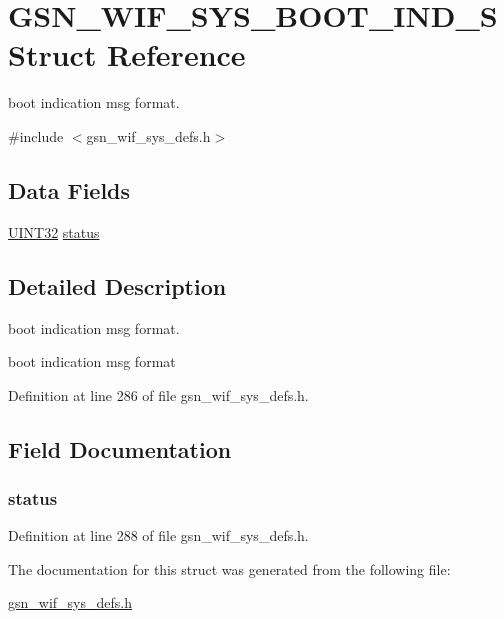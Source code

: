 \hypertarget{a00347}{
\section{GSN\_\-WIF\_\-SYS\_\-BOOT\_\-IND\_\-S Struct Reference}
\label{a00347}
}


boot indication msg format.  




{\ttfamily \#include $<$gsn\_\-wif\_\-sys\_\-defs.h$>$}

\subsection*{Data Fields}
\begin{DoxyCompactItemize}
\item 
\hyperlink{a00660_gae1e6edbbc26d6fbc71a90190d0266018}{UINT32} \hyperlink{a00347_ac6b7193d1fe7063cf448ef96398230d8}{status}
\end{DoxyCompactItemize}


\subsection{Detailed Description}
boot indication msg format. 

boot indication msg format 

Definition at line 286 of file gsn\_\-wif\_\-sys\_\-defs.h.



\subsection{Field Documentation}
\hypertarget{a00347_ac6b7193d1fe7063cf448ef96398230d8}{
\subsubsection[{status}]{ {\bf status}}}
\label{a00347_ac6b7193d1fe7063cf448ef96398230d8}


Definition at line 288 of file gsn\_\-wif\_\-sys\_\-defs.h.



The documentation for this struct was generated from the following file:\begin{DoxyCompactItemize}
\item 
\hyperlink{a00612}{gsn\_\-wif\_\-sys\_\-defs.h}\end{DoxyCompactItemize}
